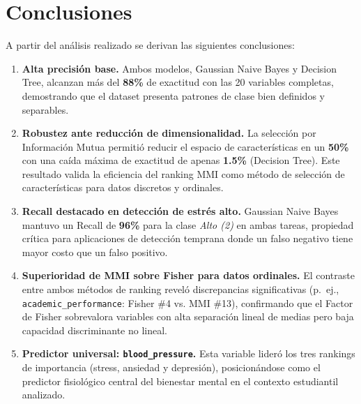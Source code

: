 \documentclass[12pt, letterpaper]{article}
\begin{document}
\section{Conclusiones}

A partir del análisis realizado se derivan las siguientes conclusiones:

\begin{enumerate}

    \item \textbf{Alta precisión base.}
    Ambos modelos, Gaussian Naive Bayes y Decision Tree, alcanzan más del
    \textbf{88\%} de exactitud con las 20 variables completas, demostrando
    que el dataset presenta patrones de clase bien definidos y separables.

    \item \textbf{Robustez ante reducción de dimensionalidad.}
    La selección por Información Mutua permitió reducir el espacio de
    características en un \textbf{50\%} con una caída máxima de exactitud
    de apenas \textbf{1.5\%} (Decision Tree). Este resultado valida la
    eficiencia del ranking MMI como método de selección de características
    para datos discretos y ordinales.

    \item \textbf{Recall destacado en detección de estrés alto.}
    Gaussian Naive Bayes mantuvo un Recall de \textbf{96\%} para la clase
    \textit{Alto (2)} en ambas tareas, propiedad crítica para aplicaciones
    de detección temprana donde un falso negativo tiene mayor costo que
    un falso positivo.

    \item \textbf{Superioridad de MMI sobre Fisher para datos ordinales.}
    El contraste entre ambos métodos de ranking reveló discrepancias
    significativas (p.~ej., \texttt{academic\_performance}: Fisher \#4 vs.
    MMI \#13), confirmando que el Factor de Fisher sobrevalora variables
    con alta separación lineal de medias pero baja capacidad discriminante
    no lineal.

    \item \textbf{Predictor universal: \texttt{blood\_pressure}.}
    Esta variable lideró los tres rankings de importancia (stress, ansiedad
    y depresión), posicionándose como el predictor fisiológico central del
    bienestar mental en el contexto estudiantil analizado.

\end{enumerate}
\end{document}
